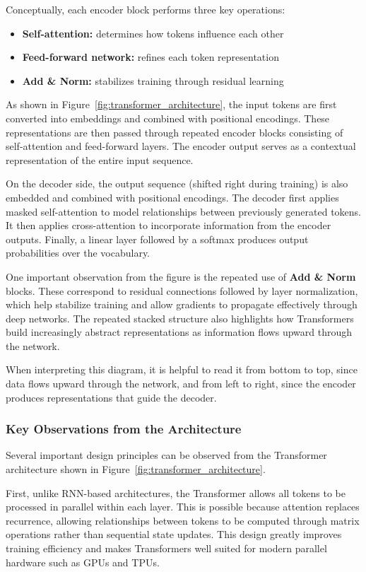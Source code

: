 \documentclass[11pt]{article}
\begin{document}
Conceptually, each encoder block performs three key operations:
\begin{itemize}
\item \textbf{Self-attention:} determines how tokens influence each other
\item \textbf{Feed-forward network:} refines each token representation
\item \textbf{Add \& Norm:} stabilizes training through residual learning
\end{itemize}

As shown in Figure~\ref{fig:transformer_architecture}, the input tokens are first converted into embeddings and combined with positional encodings. These representations are then passed through repeated encoder blocks consisting of self-attention and feed-forward layers. The encoder output serves as a contextual representation of the entire input sequence.

On the decoder side, the output sequence (shifted right during training) is also embedded and combined with positional encodings. The decoder first applies masked self-attention to model relationships between previously generated tokens. It then applies cross-attention to incorporate information from the encoder outputs. Finally, a linear layer followed by a softmax produces output probabilities over the vocabulary.

One important observation from the figure is the repeated use of \textbf{Add \& Norm} blocks. These correspond to residual connections followed by layer normalization, which help stabilize training and allow gradients to propagate effectively through deep networks. The repeated stacked structure also highlights how Transformers build increasingly abstract representations as information flows upward through the network.

When interpreting this diagram, it is helpful to read it from bottom to top, since data flows upward through the network, and from left to right, since the encoder produces representations that guide the decoder.

\subsubsection{Key Observations from the Architecture}

Several important design principles can be observed from the Transformer architecture shown in Figure~\ref{fig:transformer_architecture}.

First, unlike RNN-based architectures, the Transformer allows all tokens to be processed in parallel within each layer. This is possible because attention replaces recurrence, allowing relationships between tokens to be computed through matrix operations rather than sequential state updates. This design greatly improves training efficiency and makes Transformers well suited for modern parallel hardware such as GPUs and TPUs.
\end{document}
